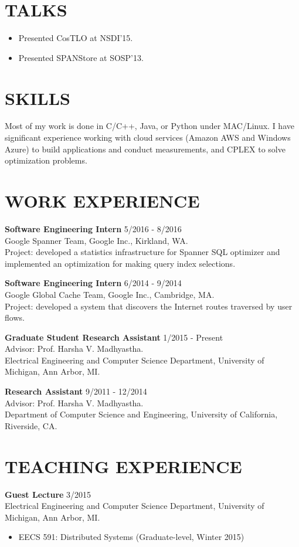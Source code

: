 \documentclass[zhemargin]{res}
\begin{document}
\begin{resume}
\section{\small TALKS}
	\begin{itemize}[leftmargin=*, topsep=-10pt] %
	\item Presented CosTLO at NSDI'15.
    \item Presented SPANStore at SOSP'13.
	\end{itemize}

\section{\small SKILLS}
	Most of my work is done in C/C++, Java, or Python under MAC/Linux. I have significant experience working with cloud services (Amazon AWS and Windows Azure) to build applications and conduct measurements, and CPLEX to solve optimization problems.

\section{\small WORK EXPERIENCE}
    \textbf{Software Engineering Intern} \hfill 5/2016 - 8/2016 \\
    Google Spanner Team, Google Inc., Kirkland, WA.\\
    Project: developed a statistics infrastructure for Spanner SQL optimizer and implemented an optimization for making query index selections.

    \textbf{Software Engineering Intern} \hfill 6/2014 - 9/2014 \\
    Google Global Cache Team, Google Inc., Cambridge, MA.\\
    Project: developed a system that discovers the Internet routes traversed by user flows.

    \textbf{Graduate Student Research Assistant} \hfill 1/2015 - Present \\
    Advisor: Prof. Harsha V. Madhyastha.\\
    Electrical Engineering and Computer Science Department, University of Michigan, Ann Arbor, MI.

    \textbf{Research Assistant} \hfill 9/2011 - 12/2014 \\
    Advisor: Prof. Harsha V. Madhyastha.\\
    Department of Computer Science and Engineering, University of California, Riverside, CA.

\section{\small TEACHING EXPERIENCE}
    \textbf{Guest Lecture} \hfill 3/2015\\
    Electrical Engineering and Computer Science Department, University of Michigan, Ann Arbor, MI.
    \begin{itemize}
    \item EECS 591: Distributed Systems (Graduate-level, Winter 2015)
    \end{itemize}


\end{resume}
\end{document}
